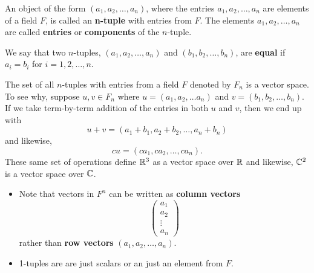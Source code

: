 \begin{definition}[n-tuples]
    An object of the form \( (a_{1}, a_{2}, \dots ,a_{n}) \), where the entries \( a_{1}, a_{2} , \dots, a_{n} \) are elements of a field \( F  \), is called an \textbf{n-tuple} with entries from \( F  \). The elements \( a_{1}, a_{2} , \dots, a_{n} \) are called \textbf{entries} or \textbf{components} of the \( n \)-tuple.
\end{definition}


\begin{definition}
    We say that two \( n \)-tuples, \( (a_{1}, a_{2}, \dots, a_{n}) \) and \( (b_{1}, b_{2}, \dots , b_{n}) \),  are \textbf{equal} if \( a_{i} = b_{i}  \) for \( i = 1,2, \dots, n \).  
\end{definition}

\begin{eg}
    The set of all \( n \)-tuples with entries from a field \( F  \) denoted by \( F_{n} \) is a vector space. To see why, suppose \( u, v \in F_{n}  \) where \( u = (a_{1}, a_{2}, \dots a_{n}) \) and \( v = (b_{1}, b_{2}, \dots, b_{n}) \). If we take term-by-term addition of the entries in both \( u  \) and \(  v  \), then we end up with 
    \[  u + v = (a_{1} + b_{1}, a_{2} + b_{2}, \dots , a_{n} + b_{n}) \]
and likewise,
    \[ cu = (ca_{1}, ca_{2}, \dots, ca_{n}).   \]
    These same set of operations define \( \mathbb{R} ^{3} \) as a vector space over \( \mathbb{R}  \) and likewise, \( \mathbb{C} ^{2} \) is a vector space over \( \mathbb{C}  \).

\end{eg}

\begin{itemize}
    \item 
    Note that vectors in \( F^{n} \) can be written as \textbf{column vectors} 
            \[  \begin{pmatrix}
                a_{1} \\
                a_{2} \\
                \vdots \\ 
                a_{n}
            \end{pmatrix} \]
    rather than \textbf{row vectors} \( (a_{1} , a_{2}, \dots , a_{n}) \). 
\item 1-tuples are are just scalars or an just an element from \( F \). 
\end{itemize}


